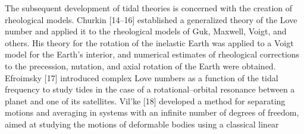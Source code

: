 \documentclass[fontsize = 11pt,a4paper]{article}
\begin{document}
\begin{multicols}{2}
\indent The subsequent development of tidal theories is
concerned with the creation of rheological models.
Churkin [14–16] established a generalized theory of
the Love number and applied it to the rheological
models of Guk, Maxwell, Voigt, and others. His
theory for the rotation of the inelastic Earth was applied
to a Voigt model for the Earth’s interior, and
numerical estimates of rheological corrections to the
precession, nutation, and axial rotation of the Earth
were obtained. Efroimsky [17] introduced complex
Love numbers as a function of the tidal frequency to
study tides in the case of a rotational–orbital resonance
between a planet and one of its satellites.
Vil’ke [18] developed a method for separating motions
and averaging in systems with an infinite number
of degrees of freedom, aimed at studying the
motions of deformable bodies using a classical linear
\end{multicols}

\pagebreak
\end{document}

